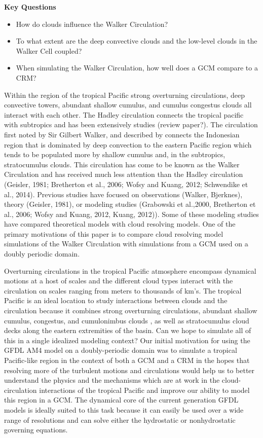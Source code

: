 \documentclass[draft]{agujournal2019}
\begin{document}
\textbf{Key Questions}
\begin{itemize}
  \item{How do clouds influence the Walker Circulation?}
  \item{To what extent are the deep convective clouds and the low-level clouds in the Walker Cell coupled?}
  \item{When simulating the Walker Circulation, how well does a GCM compare to a CRM?}  
\end{itemize}

Within the region of the tropical Pacific strong overturning circulations, deep convective towers, abundant shallow 
cumulus, and cumulus congestus clouds all interact with each other.  The Hadley circulation connects the tropical 
pacific with subtropics and has been extensively studies (review paper?).  The circulation first 
  noted by Sir Gilbert Walker, and described by  connects the Indonesian region that is dominated by deep 
  convection to the eastern Pacific region which tends to be populated more by shallow cumulus and, in the 
  subtropics, stratocumulus clouds.  This circulation has come to be 
  known as the Walker Circulation and has received much less attention than the Hadley circulation (Geisler, 1981; Bretherton et al., 
  2006; Wofsy and Kuang, 2012; Schwendike et al., 2014).  Previous studies have focused on observations (Walker, Bjerknes), theory 
  (Geisler, 1981), or modeling studies (Grabowski et al.,2000, Bretherton et al., 2006; Wofsy and Kuang, 2012, 
  Kuang, 2012)).  Some of these modeling studies have compared theoretical models with cloud
  resolving models.  One of the primary motivations of this paper is to compare cloud resolving model simulations of the Walker 
  Circulation with simulations from a GCM used on a doubly periodic domain.
  
  Overturning circulations in the tropical Pacific atmosphere encompass dynamical motions at a host of scales 
and the different cloud types interact with the circulation on scales ranging from meters to thousands of km's.  
The tropical Pacific is an ideal location to study interactions between clouds and the circulation 
because it combines strong overturning circulations, abundant shallow cumulus, congestus, and cumulonimbus 
clouds \cite{Johnson1999}, as well as stratocumulus cloud decks along the eastern extremities of the basin.
Can we hope to simulate all of this in a single idealized modeling context?   Our initial motivation for using the 
GFDL AM4 model on a doubly-periodic domain was to simulate a tropical Pacific-like region 
in the context of both a GCM and a CRM in the hopes that resolving more of the turbulent motions and circulations
would help us to better understand the physics and the mechanisms which are at work in the cloud-circulation
interactions of the tropical Pacific and improve our ability to model this region in a GCM.    The dynamical core 
of the current generation GFDL models is ideally suited to this task because it can easily be used over a wide 
range of resolutions and can solve either the hydrostatic or nonhydrostatic governing equations.  
\end{document}
